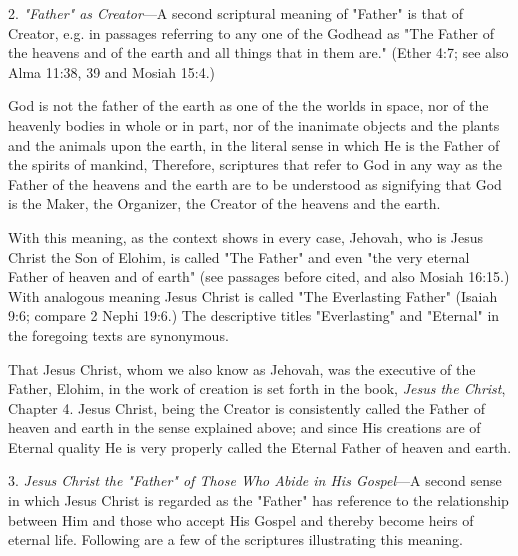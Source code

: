 2. \textit{"Father" as Creator}—A second scriptural meaning of "Father" is that of Creator, e.g. in
passages referring to any one of the Godhead as "The Father of the heavens and of the earth
and all things that in them are." (Ether 4:7; see also Alma 11:38, 39 and Mosiah 15:4.)

God is not the father of the earth as one of the the worlds in space, nor of the heavenly bodies
in whole or in part, nor of the inanimate objects and the plants and the animals upon the
earth, in the literal sense in which He is the Father of the spirits of mankind, Therefore,
scriptures that refer to God in any way as the Father of the heavens and the earth are to be
understood as signifying that God is the Maker, the Organizer, the Creator of the heavens and
the earth.

With this meaning, as the context shows in every case, Jehovah, who is Jesus Christ the Son
of Elohim, is called "The Father" and even "the very eternal Father of heaven and of earth"
(see passages before cited, and also Mosiah 16:15.) With analogous meaning Jesus Christ is
called "The Everlasting Father" (Isaiah 9:6; compare 2 Nephi 19:6.) The descriptive titles
"Everlasting" and "Eternal" in the foregoing texts are synonymous.

That Jesus Christ, whom we also know as Jehovah, was the executive of the Father, Elohim,
in the work of creation is set forth in the book, \textit{Jesus the Christ}, Chapter 4. Jesus Christ,
being the Creator is consistently called the Father of heaven and earth in the sense explained
above; and since His creations are of Eternal quality He is very properly called the Eternal
Father of heaven and earth.

3. \textit{Jesus Christ the "Father" of Those Who Abide in His Gospel}—A second sense in which
Jesus Christ is regarded as the "Father" has reference to the relationship between Him and
those who accept His Gospel and thereby become heirs of eternal life. Following are a few of
the scriptures illustrating this meaning.

